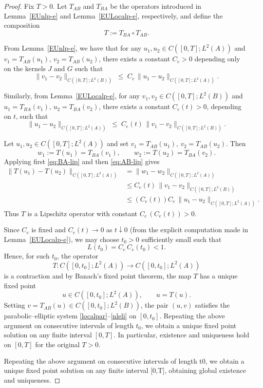 \documentclass[reqno]{amsart}
\numberwithin{equation}{section}
\begin{document}
\begin{proof} Fix $T>0$.
Let $T_{AB}$ and $T_{BA}$ be the operators introduced in
Lemma~\ref{EUnlp-e} and Lemma~\ref{EULocalp-e}, respectively, and define
the composition
\[
T := T_{BA}\circ T_{AB}.
\]

From Lemma~\ref{EUnlp-e}, we have that for any
$u_1,u_2\in C([0,T];L^2(A))$ and
$v_1=T_{AB}(u_1)$, $v_2=T_{AB}(u_2)$,
there exists a constant $C_e>0$ depending only on the kernels
$J$ and $G$ such that
\begin{equation}\label{eq:AB-lip}
\|v_1-v_2\|_{C([0,T];L^2(B))}
\;\le\; C_e\,\|u_1-u_2\|_{C([0,T];L^2(A))}.
\end{equation}

Similarly, from Lemma~\ref{EULocalp-e}, for any
$v_1,v_2\in C([0,T];L^2(B))$ and
$u_1=T_{BA}(v_1)$, $u_2=T_{BA}(v_2)$,
there exists a constant $C_e(t)>0$, depending on $t$, such that
\begin{equation}\label{eq:BA-lip}
\|u_1-u_2\|_{C([0,T];L^2(A))}
\;\le\; C_e(t)\,\|v_1-v_2\|_{C([0,T];L^2(B))}.
\end{equation}

Let $u_1,u_2\in C([0,T];L^2(A))$ and set
$v_1=T_{AB}(u_1), \ v_2=T_{AB}(u_2)$. Then
\[
w_1 := T(u_1)=T_{BA}(v_1),\qquad 
w_2 := T(u_2)=T_{BA}(v_2).
\]
Applying first \eqref{eq:BA-lip} and then \eqref{eq:AB-lip} gives
$$
\begin{array}{rl}
\displaystyle \|T(u_1)-T(u_2)\|_{C([0,T];L^2(A))}
& \displaystyle = \|w_1-w_2\|_{C([0,T];L^2(A))}  \\[10pt]
& \displaystyle \le C_e(t)\,\|v_1-v_2\|_{C([0,T];L^2(B))}    \\[10pt]
&\displaystyle \le (C_e(t)) C_e\,\|u_1-u_2\|_{C([0,T];L^2(A))}.
\end{array}
$$
Thus $T$ is a Lipschitz operator with constant
$C_e\,(C_e(t))>0$.

Since $C_e$ is fixed and $C_e(t)\to 0$ as $t\downarrow 0$
(from the explicit computation made in Lemma~\eqref{EULocalp-e}),
we may choose $t_0>0$ sufficiently small such that
\[
L(t_0) = C_e\,C_e(t_0) <1.
\]
Hence, for such $t_0$, the operator
\[
T : C([0,t_0];L^2(A)) \to C([0,t_0];L^2(A))
\]
is a contraction and by Banach's fixed point theorem, the map $T$ has a unique fixed point
\[
u\in C([0,t_0];L^2(A)),
\qquad u = T(u).
\]
Setting $v=T_{AB}(u)\in C([0,t_0];L^2(B))$,
the pair $(u,v)$ satisfies the parabolic--elliptic system
\eqref{localpar}--\eqref{nleli} on $[0,t_0]$.
Repeating the above argument on consecutive intervals of length $t_0$,
we obtain a unique fixed point solution on any finite interval $[0,T]$.
In particular, existence and uniqueness hold on $[0,T]$ for the original $T>0$.

Repeating the above argument on consecutive intervals of length t0, we obtain a unique fixed point
solution on any finite interval [0,T], obtaining global existence and uniqueness.
\end{proof}
\end{document}
